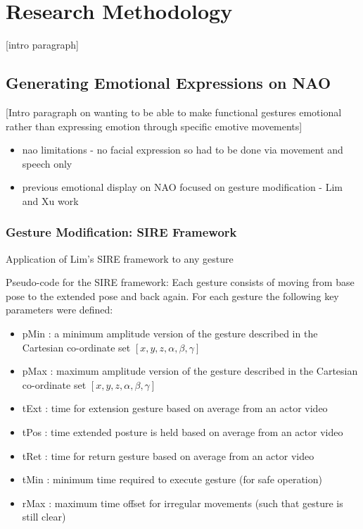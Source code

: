 \documentclass[11pt,a4paper]{report}
\begin{document}
\chapter{Research Methodology}
[intro paragraph]
\section{Generating Emotional Expressions on NAO}
[Intro paragraph on wanting to be able to make functional gestures emotional rather than expressing emotion through specific emotive movements]

\begin{itemize}
	\item nao limitations - no facial expression so had to be done via movement and speech only
	\item previous emotional display on NAO focused on gesture modification - Lim and Xu work
	
\end{itemize}

\subsection{Gesture Modification: SIRE Framework}
Application of Lim's SIRE framework to any gesture

Pseudo-code for the SIRE framework:
Each gesture consists of moving from base pose to the extended pose and back again. For each gesture the following key parameters were defined:
\begin{itemize}
\item pMin : a minimum amplitude version of the gesture described in the Cartesian co-ordinate set $[x,y,z,\alpha,\beta,\gamma]$
\item pMax : maximum amplitude version of the gesture described in the Cartesian co-ordinate set $[x,y,z,\alpha,\beta,\gamma]$
\item tExt : time for extension gesture based on average from an actor video
\item tPos : time extended posture is held based on average from an actor video
\item tRet : time for return gesture based on average from an actor video
\item tMin : minimum time required to execute gesture (for safe operation)
\item rMax : maximum time offset for irregular movements (such that gesture is still clear)
\end{itemize}
\end{document}
